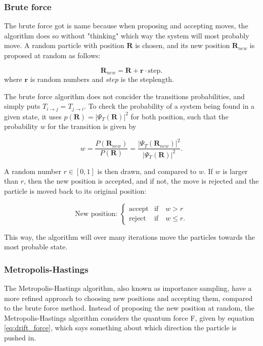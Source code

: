 \documentclass[norsk,a4paper,12pt]{article}
\begin{document}
\subsubsection{Brute force}
The brute force got is name because when proposing and accepting moves, the algorithm does so without "thinking" which way the system will most probably move. A random particle with position $\boldsymbol{R}$ is chosen, and its new position $\boldsymbol{R}_{new}$ is proposed at random as follows:

\begin{equation}
\boldsymbol{R}_{new} = \boldsymbol{R} + \boldsymbol{r}\cdot \text{step}.
\end{equation}
where $\boldsymbol{r}$ is random numbers and $step$ is the steplength.
\par 
\vspace{3mm}
The brute force algorithm does not concider the transitions probabilities, and simply puts $T_{i\rightarrow j} = T_{j\rightarrow i}$. To check the probability of a system being found in a given state, it uses $p(\boldsymbol{R})=|\Psi_T(\boldsymbol{R})|^2$ for both position, such that the probability $w$ for the transition is given by

\begin{equation}
w=\frac{P(\boldsymbol{R}_{new})}{P(\boldsymbol{R})}=\frac{|\Psi_T(\boldsymbol{R}_{new})|^2}{|\Psi_T(\boldsymbol{R})|^2}.
\end{equation}

A random number $r \in [0,1]$ is then drawn, and compared to $w$. If $w$ is larger than $r$, then the new position is accepted, and if not, the move is rejected and the particle is moved back to its original position:

\begin{equation}
\text{New position: }
\begin{cases} 
\text{accept} & \text{if}\quad w > r \\
\text{reject} & \text{if}\quad w \leq r.
\end{cases}
\end{equation}

This way, the algorithm will over many iterations move the particles towards the most probable state.


\subsubsection{Metropolis-Hastings}
The Metropolis-Hastings algorithm, also known as importance sampling, have a more refined approach to choosing new positions and accepting them, compared to the brute force method. Instead of proposing the new position at random, the Metropolis-Hastings algorithm considers the quantum force F, given by equation \ref{eq:drift_force}, which says something about which direction the particle is pushed in. 
\end{document}
